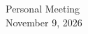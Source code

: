 \documentclass[11pt,a4paper]{article}
\begin{document}
\begin{center}
{\LARGE Personal Meeting}\\[0.4em]
{\large November 9, 2026}
\end{center}
\end{document}
